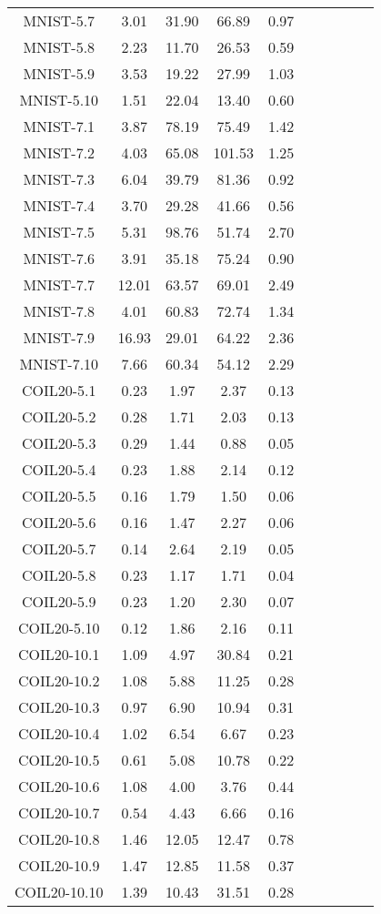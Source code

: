 \documentclass[8pt]{article}
\begin{document}
\begin{table}[t]
\begin{table}
\begin{table}[t]
\begin{center}
{\begin{tabular}{|c|c|c|cc|ccccc|}
MNIST-5.7& 3.01& 31.90& 66.89& 0.97\\
MNIST-5.8& 2.23& 11.70& 26.53& 0.59\\
MNIST-5.9& 3.53& 19.22& 27.99& 1.03\\
MNIST-5.10& 1.51& 22.04& 13.40& 0.60\\
\hline
MNIST-7.1& 3.87& 78.19& 75.49& 1.42\\
MNIST-7.2& 4.03& 65.08& 101.53& 1.25\\
MNIST-7.3& 6.04& 39.79& 81.36& 0.92\\
MNIST-7.4& 3.70& 29.28& 41.66& 0.56\\
MNIST-7.5& 5.31& 98.76& 51.74& 2.70\\
MNIST-7.6& 3.91& 35.18& 75.24& 0.90\\
MNIST-7.7& 12.01& 63.57& 69.01& 2.49\\
MNIST-7.8& 4.01& 60.83& 72.74& 1.34\\
MNIST-7.9& 16.93& 29.01& 64.22& 2.36\\
MNIST-7.10& 7.66& 60.34& 54.12& 2.29\\
\hline
COIL20-5.1& 0.23& 1.97& 2.37& 0.13\\
COIL20-5.2& 0.28& 1.71& 2.03& 0.13\\
COIL20-5.3& 0.29& 1.44& 0.88& 0.05\\
COIL20-5.4& 0.23& 1.88& 2.14& 0.12\\
COIL20-5.5& 0.16& 1.79& 1.50& 0.06\\
COIL20-5.6& 0.16& 1.47& 2.27& 0.06\\
COIL20-5.7& 0.14& 2.64& 2.19& 0.05\\
COIL20-5.8& 0.23& 1.17& 1.71& 0.04\\
COIL20-5.9& 0.23& 1.20& 2.30& 0.07\\
COIL20-5.10& 0.12& 1.86& 2.16& 0.11\\
\hline
COIL20-10.1& 1.09& 4.97& 30.84& 0.21\\
COIL20-10.2& 1.08& 5.88& 11.25& 0.28\\
COIL20-10.3& 0.97& 6.90& 10.94& 0.31\\
COIL20-10.4& 1.02& 6.54& 6.67& 0.23\\
COIL20-10.5& 0.61& 5.08& 10.78& 0.22\\
COIL20-10.6& 1.08& 4.00& 3.76& 0.44\\
COIL20-10.7& 0.54& 4.43& 6.66& 0.16\\
COIL20-10.8& 1.46& 12.05& 12.47& 0.78\\
COIL20-10.9& 1.47& 12.85& 11.58& 0.37\\
COIL20-10.10& 1.39& 10.43& 31.51& 0.28\\
\hline
\end{tabular}
}
\end{center}
\end{table}


\end{table}
\end{table}
\end{document}
